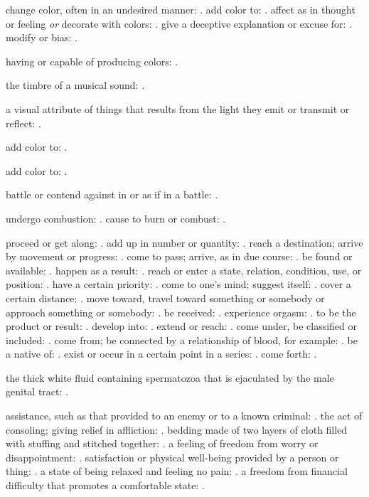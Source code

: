   change color, often in an undesired manner: . add color to: . affect as in thought or feeling \textit{or} decorate with colors: . give a deceptive explanation or excuse for: . modify or bias: .

  having or capable of producing colors: .

  the timbre of a musical sound: .

  a visual attribute of things that results from the light they emit or transmit or reflect: .

  add color to: .

  add color to: .

  battle or contend against in or as if in a battle: .

  undergo combustion: . cause to burn or combust: .

  proceed or get along: . add up in number or quantity: . reach a destination; arrive by movement or progress: . come to pass; arrive, as in due course: . be found or available: . happen as a result: . reach or enter a state, relation, condition, use, or position: . have a certain priority: . come to one's mind; suggest itself: . cover a certain distance: . move toward, travel toward something or somebody or approach something or somebody: . be received: . experience orgasm: . to be the product or result: . develop into: . extend or reach: . come under, be classified or included: . come from; be connected by a relationship of blood, for example: . be a native of: . exist or occur in a certain point in a series: . come forth: .

  the thick white fluid containing spermatozoa that is ejaculated by the male genital tract: .

  assistance, such as that provided to an enemy or to a known criminal: . the act of consoling; giving relief in affliction: . bedding made of two layers of cloth filled with stuffing and stitched together: . a feeling of freedom from worry or disappointment: . satisfaction or physical well-being provided by a person or thing: . a state of being relaxed and feeling no pain: . a freedom from financial difficulty that promotes a comfortable state: .

